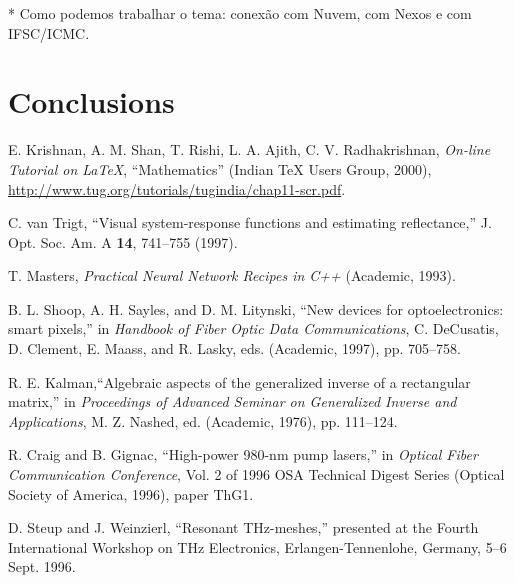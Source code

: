 \documentclass[letterpaper,10pt]{article}
\begin{document}

    * Como podemos trabalhar o tema:
    conexão com Nuvem, com Nexos e com IFSC/ICMC.

\section{Conclusions}

\begin{thebibliography}{99}

 E. Krishnan, A. M. Shan, T. Rishi, L. A. Ajith, C. V.
Radhakrishnan, \textit{On-line Tutorial on \LaTeX{}},
``Mathematics'' (Indian \TeX{} Users Group, 2000), \\
\url{http://www.tug.org/tutorials/tugindia/chap11-scr.pdf}.

 C. van Trigt, ``Visual system-response functions and estimating reflectance,''
J. Opt. Soc. Am. A \textbf{14}, 741--755 (1997).

 T. Masters, \emph{Practical Neural Network Recipes in C++} (Academic, 1993).

 B. L. Shoop, A. H. Sayles, and D. M. Litynski, ``New devices for optoelectronics: smart pixels,''
in \emph{Handbook of Fiber Optic Data Communications},
C. DeCusatis, D. Clement, E. Maass, and R. Lasky, eds. (Academic, 1997), pp. 705--758.

 R. E. Kalman,``Algebraic aspects of the generalized inverse of a rectangular matrix,'' in
\emph{Proceedings of Advanced Seminar on Generalized Inverse and Applications}, M. Z. Nashed, ed. (Academic, 1976), pp. 111--124.

 R. Craig and B. Gignac, ``High-power 980-nm pump lasers,''
in \emph{Optical Fiber Communication Conference}, Vol. 2 of 1996 OSA Technical Digest Series (Optical Society of America, 1996), paper ThG1.

 D. Steup and J. Weinzierl, ``Resonant THz-meshes,''
presented at the Fourth International Workshop on THz Electronics, Erlangen-Tennenlohe, Germany, 5--6 Sept. 1996.

\end{thebibliography}
\end{document}
